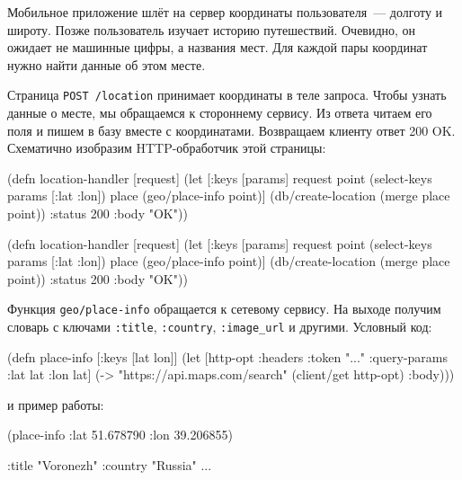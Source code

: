 Мобильное приложение шлёт на сервер координаты пользователя~--- долготу и
широту. Позже пользователь изучает историю путешествий. Очевидно, он ожидает не
машинные цифры, а названия мест. Для каждой пары координат нужно найти данные об
этом месте.

Страница \verb|POST /location| принимает координаты в теле запроса. Чтобы узнать
данные о месте, мы обращаемся к стороннему сервису. Из ответа читаем его поля и
пишем в базу вместе с координатами. Возвращаем клиенту ответ 200 OK. Схематично
изобразим HTTP-обработчик этой страницы:

\ifnarrow

\begin{english}
  \begin{clojure}
(defn location-handler [request]
  (let [{:keys [params]} request
        point (select-keys params
                [:lat :lon])
        place (geo/place-info point)]
    (db/create-location
      (merge place point))
    {:status 200 :body "OK"}))
  \end{clojure}
\end{english}

\else

\begin{english}
  \begin{clojure}
(defn location-handler [request]
  (let [{:keys [params]} request
        point (select-keys params [:lat :lon])
        place (geo/place-info point)]
    (db/create-location (merge place point))
    {:status 200 :body "OK"}))
  \end{clojure}
\end{english}

\fi

Функция \verb|geo/place-info| обращается к сетевому сервису. На выходе получим
словарь с ключами \verb|:title|, \verb|:country|, \verb|:image_url| и
другими. Условный код:


\begin{english}
  \begin{clojure}
(defn place-info
  [{:keys [lat lon]}]
  (let [http-opt {:headers {:token "..."}
                  :query-params {:lat lat :lon lat}}]
    (-> "https://api.maps.com/search"
        (client/get http-opt)
        :body)))
  \end{clojure}
\end{english}

\noindent
и пример работы:

\begin{english}
  \begin{clojure}
(place-info {:lat 51.678790
             :lon 39.206855})

{:title "Voronezh"
 :country "Russia"
 ...}
  \end{clojure}
\end{english}

